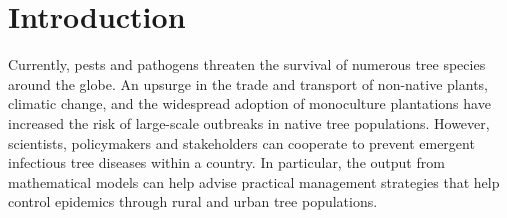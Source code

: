 
\chapter{Introduction}


Currently, pests and pathogens threaten the survival of numerous tree species around the globe. 
An upsurge in the trade and transport of non-native plants, climatic change, and the widespread adoption of monoculture plantations have increased the risk of large-scale outbreaks in native tree populations. 
However, scientists, policymakers and stakeholders can cooperate to prevent emergent infectious tree diseases within a country. 
In particular, the output from mathematical models can help advise practical management strategies that help control epidemics through rural and urban tree populations.

